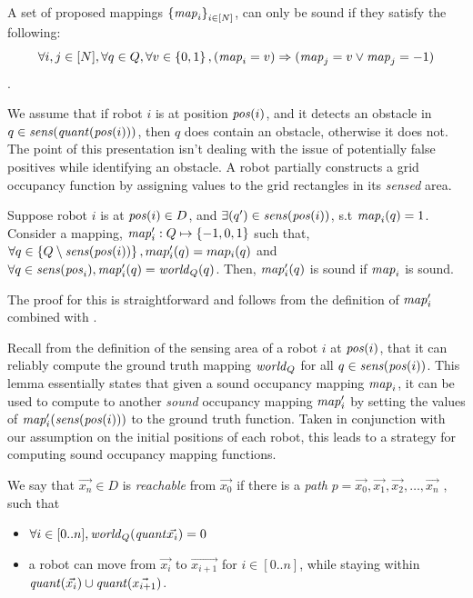 A set of proposed mappings $\left\{\mathit{map}_i\right\}_{i\in [N]}$, can only be sound if they satisfy the following: $$\forall i,j \in [N],\forall q\in Q, \forall v \in \left\{0,1\right\}, (\mathit{map}_i = v) \Rightarrow (\mathit{map}_j = v \vee \mathit{map}_j = -1)$$.

We assume that if robot $i$ is at position $\mathit{pos}(i)$, and it detects an obstacle in $q \in \mathit{sens}(\mathit{quant}(\mathit{pos}(i)))$, then $q$ does contain an obstacle, otherwise it does not. The point of this presentation isn't dealing with the issue of potentially false positives while identifying an obstacle. A robot partially constructs a grid occupancy function by assigning values to the grid rectangles in its \emph{sensed} area.

\begin{lemma}
    \label{lem:extension}
    Suppose robot $i$ is at $\mathit{pos}(i)\in D$, and $\exists(q^\prime)\in \mathit{sens}(\mathit{pos}(i))$,
    s.t $\mathit{map}_i(q) = 1$. Consider a mapping, $\mathit{map}^\prime_i:Q \mapsto \left\{-1,0,1\right\}$
    such that, $\forall q\in \left\{Q \setminus \mathit{sens}(\mathit{pos}(i))\right\}, map^\prime_i(q) = map_i(q)$
    and $\forall q \in \mathit{sens}(\mathit{pos}_i), \mathit{map}^\prime_i(q) = \mathit{world}_Q(q)$.
    Then, $\mathit{map}^\prime_i(q)$ is sound if $\mathit{map}_i$ is sound.
\end{lemma}

The proof for this is straightforward and follows from the definition of $\mathit{map}^\prime_i$ combined with .

Recall from the definition of the sensing area of a robot $i$ at $\mathit{pos}(i)$, that it can reliably compute the ground truth mapping $\mathit{world}_Q$ for all $q \in \mathit{sens}(\mathit{pos}(i))$. This lemma essentially states that given a sound occupancy mapping $\mathit{map}_i$, it can be used to compute to another \emph{sound} occupancy mapping $\mathit{map}^\prime_i$ by setting the values of $\mathit{map}^\prime_i(\mathit{sens}(\mathit{pos}(i)))$ to the ground truth function. Taken in conjunction with our assumption on the initial positions of each robot, this leads to a strategy for computing sound occupancy mapping functions.

\begin{definition}
 We say that $\Vec{x_n}\in D$ is \emph{reachable} from $\Vec{x_0}$ if there is a \emph{path} $p = \Vec{x_0},\Vec{x_1}, \Vec{x_2},\ldots, \Vec{x_n}$ , such that
\begin{itemize}
\item $\forall i \in [0..n],\mathit{world}_Q(\mathit{quant}{\Vec{x_i}}) = 0$
\item a robot can move from $\Vec{x_i}$ to $\Vec{x_{i+1}}$ for $i \in [0..n]$, while staying within $\mathit{quant}(\Vec{x_i}) \cup \mathit{quant}(\Vec{x_{i+1}})$.
\end{itemize}
\end{definition}

